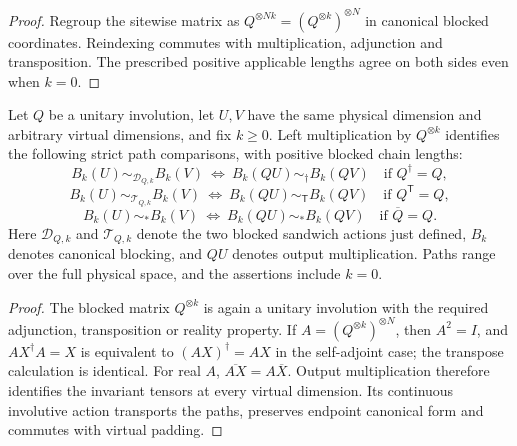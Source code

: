 \begin{proof}\leanok
    Regroup the sitewise matrix as
    $Q^{\otimes Nk}=(Q^{\otimes k})^{\otimes N}$ in canonical blocked
    coordinates. Reindexing commutes with multiplication, adjunction
    and transposition. The prescribed positive applicable lengths
    agree on both sides even when $k=0$.
\end{proof}

\begin{lemma}
    \label{lem:mpu_blocked_physical_involution_paths}
    \leanok
    Let $Q$ be a unitary involution, let $U,V$ have the same physical
    dimension and arbitrary virtual dimensions, and fix $k\geq0$.
    Left multiplication by $Q^{\otimes k}$ identifies the following
    strict path comparisons, with positive blocked chain lengths:
    \[
        B_k(U)\sim_{\mathcal D_{Q,k}}B_k(V)
        \ \Longleftrightarrow\ B_k(QU)\sim_\dagger B_k(QV)
        \quad\text{if }Q^\dagger=Q,
    \]
    \[
        B_k(U)\sim_{\mathcal T_{Q,k}}B_k(V)
        \ \Longleftrightarrow\ B_k(QU)\sim_{\mathsf T}B_k(QV)
        \quad\text{if }Q^{\mathsf T}=Q,
    \]
    \[
        B_k(U)\sim_*B_k(V)
        \ \Longleftrightarrow\ B_k(QU)\sim_*B_k(QV)
        \quad\text{if }\overline Q=Q.
    \]
    Here $\mathcal D_{Q,k}$ and $\mathcal T_{Q,k}$ denote the
    two blocked sandwich actions just defined, $B_k$ denotes canonical
    blocking, and $QU$ denotes output multiplication. Paths range over
    the full physical space, and the assertions include $k=0$.
\end{lemma}

\begin{proof}\leanok
    The blocked matrix $Q^{\otimes k}$ is again a unitary involution
    with the required adjunction, transposition or reality property.
    If $A=(Q^{\otimes k})^{\otimes N}$, then $A^2=I$, and
    $AX^\dagger A=X$ is equivalent to $(AX)^\dagger=AX$ in the
    self-adjoint case; the transpose calculation is identical.
    For real $A$, $\overline{AX}=A\overline X$. Output multiplication
    therefore identifies the invariant tensors at every virtual
    dimension. Its continuous involutive action transports the paths,
    preserves endpoint canonical form and commutes with virtual padding.
\end{proof}

